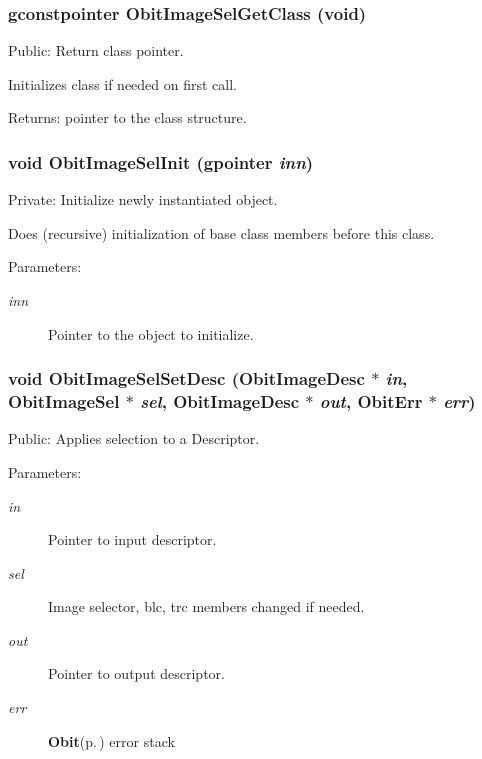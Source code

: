 \subsubsection{\setlength{\rightskip}{0pt plus 5cm}gconstpointer Obit\-Image\-Sel\-Get\-Class (void)}\label{ObitImageSel_8c_a7}


Public: Return class pointer. 

Initializes class if needed on first call. \begin{Desc}
\item[Returns:]pointer to the class structure. \end{Desc}
\subsubsection{\setlength{\rightskip}{0pt plus 5cm}void Obit\-Image\-Sel\-Init (gpointer {\em inn})}\label{ObitImageSel_8c_a3}


Private: Initialize newly instantiated object. 

Does (recursive) initialization of base class members before this class. \begin{Desc}
\item[Parameters:]
\begin{description}
\item[{\em inn}]Pointer to the object to initialize. \end{description}
\end{Desc}
\subsubsection{\setlength{\rightskip}{0pt plus 5cm}void Obit\-Image\-Sel\-Set\-Desc ({\bf Obit\-Image\-Desc} $\ast$ {\em in}, {\bf Obit\-Image\-Sel} $\ast$ {\em sel}, {\bf Obit\-Image\-Desc} $\ast$ {\em out}, {\bf Obit\-Err} $\ast$ {\em err})}\label{ObitImageSel_8c_a11}


Public: Applies selection to a Descriptor. 

\begin{Desc}
\item[Parameters:]
\begin{description}
\item[{\em in}]Pointer to input descriptor. \item[{\em sel}]Image selector, blc, trc members changed if needed. \item[{\em out}]Pointer to output descriptor. \item[{\em err}]{\bf Obit}{\rm (p.\,\pageref{structObit})} error stack \end{description}
\end{Desc}
